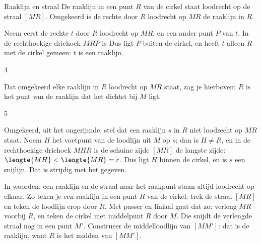 \begin{theorie}
\begin{minipage}[t]{.64\linewidth}
\vspace{0pt}
\begin{stelling}{Raaklijn en straal}
De raaklijn in een punt $R$ van de cirkel staat loodrecht op de straal $[MR]$. Omgekeerd is de rechte door $R$ loodrecht op $MR$ de raaklijn in $R$.
\end{stelling}

\begin{bewijs}
Neem eerst de rechte $t$ door $R$ loodrecht op $MR$, en een ander punt $P$ van $t$. In de rechthoekige driehoek $MRP$ is
Dus ligt $P$ buiten de cirkel, en heeft $t$ alleen $R$ met de cirkel gemeen: $t$ is een raaklijn.
\begin{alleenvoor}{4}

Dat omgekeerd elke raaklijn in $R$ loodrecht op $MR$ staat, zag je hierboven: $R$ is het punt van de raaklijn dat het dichtst bij $M$ ligt.
\end{alleenvoor}
\begin{alleenvoor}{5}

Omgekeerd, uit het ongerijmde: stel dat een raaklijn $s$ in $R$ niet loodrecht op $MR$ staat. Noem $H$ het voetpunt van de loodlijn uit $M$ op $s$; dan is $H \neq R$, en in de rechthoekige driehoek $MHR$ is de schuine zijde $[MR]$ de langste zijde: $\lengte{MH} < \lengte{MR} = r$. Dus ligt $H$ binnen de cirkel, en is $s$ een snijlijn. Dat is strijdig met het gegeven.
\end{alleenvoor}
\end{bewijs}
\end{minipage}\hfill
\begin{minipage}[t]{.32\linewidth}
\vspace{0pt}
\centering
{}
\end{minipage}
\end{theorie}

In woorden: een raaklijn en de straal naar het raakpunt staan altijd loodrecht op elkaar. Zo teken je een raaklijn in een punt $R$ van de cirkel: trek de straal $[MR]$ en teken de loodlijn erop door $R$. Met passer en liniaal gaat dat zo: verleng $MR$ voorbij $R$, en teken de cirkel met middelpunt $R$ door $M$. Die snijdt de verlengde straal nog in een punt $M'$. Construeer de middelloodlijn van $[MM']$: dat is de raaklijn, want $R$ is het midden van $[MM']$.

